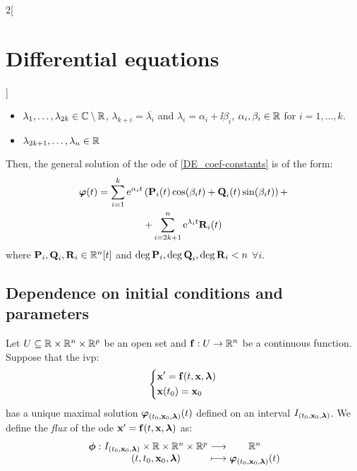 \documentclass[../../../main.tex]{subfiles}
\begin{document}
\begin{multicols}{2}[\section{Differential equations}]
\begin{corollary}
    \begin{itemize}
      \item $\lambda_1,\ldots,\lambda_{2k}\in\mathbb{C}\setminus\mathbb{R}$, $\lambda_{k+i}=\overline{\lambda_i}$ and $\lambda_i=\alpha_i+\ii\beta_i$, $\alpha_i,\beta_i\in\mathbb{R}$ for $i=1,\ldots,k$.
      \item $\lambda_{2k+1},\ldots,\lambda_n\in\mathbb{R}$
    \end{itemize}
    Then, the general solution of the ode of \cref{DE_coef-constants} is of the form:
    \begin{multline*}
      \boldsymbol{\mathrm{\varphi}}(t)=\sum_{i=1}^k\mathrm{e}^{\alpha_i t}\left(\boldsymbol{\mathrm{P}}_i(t)\cos(\beta_i t)+\boldsymbol{\mathrm{Q}}_i(t)\sin(\beta_i t)\right)+\\+\sum_{i=2k+1}^n\mathrm{e}^{\lambda_i t}\boldsymbol{\mathrm{R}}_i(t)
    \end{multline*}
    where $\boldsymbol{\mathrm{P}}_i,\boldsymbol{\mathrm{Q}}_i,\boldsymbol{\mathrm{R}}_i\in\mathbb{R}^n[t]$ and $\deg \boldsymbol{\mathrm{P}}_i,\deg\boldsymbol{\mathrm{Q}}_i,\deg\boldsymbol{\mathrm{R}}_i<n$ $\forall i$.
  \end{corollary}
  \subsection{Dependence on initial conditions and parameters}
  \begin{definition}
    Let $U\subseteq\mathbb{R}\times\mathbb{R}^n\times\mathbb{R}^p$ be an open set and $\boldsymbol{\mathrm{f}}:U\rightarrow\mathbb{R}^n$ be a continuous function. Suppose that the ivp:
    \begin{equation}\label{DE_ivp_lambda}
      \left\{
      \begin{aligned}
         & \boldsymbol{\mathrm{x}}'      =\boldsymbol{\mathrm{f}}(t,\boldsymbol{\mathrm{x}},\boldsymbol{\mathrm{\lambda}}) \\
         & \boldsymbol{\mathrm{x}}(t_0)  =\boldsymbol{\mathrm{x}}_0
      \end{aligned}
      \right.
    \end{equation}
    has a unique maximal solution $\boldsymbol{\mathrm{\varphi}}_{(t_0,\boldsymbol{\mathrm{x}}_0,\boldsymbol{\mathrm{\lambda}})}(t)$ defined on an interval $I_{(t_0,\boldsymbol{\mathrm{x}}_0,\boldsymbol{\mathrm{\lambda}})}$. We define the \textit{flux} of the ode $\boldsymbol{\mathrm{x}}'=\boldsymbol{\mathrm{f}}(t,\boldsymbol{\mathrm{x}},\boldsymbol{\mathrm{\lambda}})$ as: $$\function{\vectorfunction{\phi}}{I_{(t_0,\vectorfunction{x}_0,\vectorfunction{\lambda})}\times\RR\times\RR^n\times\RR^p}{\RR^n}{(t,t_0,\vectorfunction{x}_0,\vectorfunction{\lambda})}{\vectorfunction{\varphi}_{(t_0,\vectorfunction{x}_0,\vectorfunction{\lambda})}(t)}$$
  \end{definition}

\end{multicols}
\end{document}

